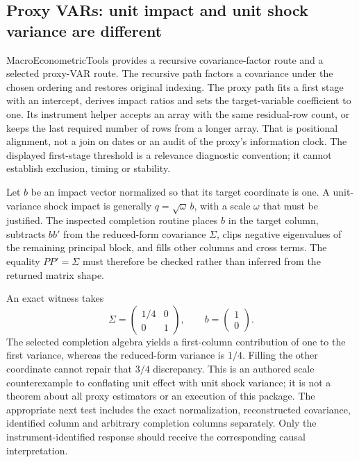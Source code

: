 \subsection{Proxy VARs: unit impact and unit shock variance are different}

MacroEconometricTools provides a recursive covariance-factor route and a selected proxy-VAR route. The recursive path factors a covariance under the chosen ordering and restores original indexing. The proxy path fits a first stage with an intercept, derives impact ratios and sets the target-variable coefficient to one. Its instrument helper accepts an array with the same residual-row count, or keeps the last required number of rows from a longer array. That is positional alignment, not a join on dates or an audit of the proxy's information clock. The displayed first-stage threshold is a relevance diagnostic convention; it cannot establish exclusion, timing or stability.~\citep{exec25_odyn_macro}

Let $b$ be an impact vector normalized so that its target coordinate is one. A unit-variance shock impact is generally $q=\sqrt{\omega}\,b$, with a scale $\omega$ that must be justified. The inspected completion routine places $b$ in the target column, subtracts $bb'$ from the reduced-form covariance $\Sigma$, clips negative eigenvalues of the remaining principal block, and fills other columns and cross terms. The equality $PP'=\Sigma$ must therefore be checked rather than inferred from the returned matrix shape.~\citep{exec25_odyn_macro}

An exact witness takes
\[
 \Sigma=\begin{pmatrix}1/4&0\\0&1\end{pmatrix},\qquad
 b=\begin{pmatrix}1\\0\end{pmatrix}.
\]
The selected completion algebra yields a first-column contribution of one to the first variance, whereas the reduced-form variance is $1/4$. Filling the other coordinate cannot repair that $3/4$ discrepancy. This is an authored scale counterexample to conflating unit effect with unit shock variance; it is not a theorem about all proxy estimators or an execution of this package. The appropriate next test includes the exact normalization, reconstructed covariance, identified column and arbitrary completion columns separately. Only the instrument-identified response should receive the corresponding causal interpretation.~\citep{exec25_odyn_macro,exec25_odyn_choice}

